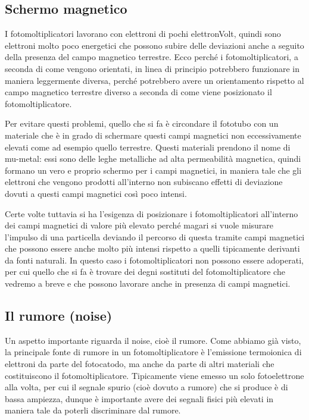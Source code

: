 \subsection{Schermo magnetico}

I fotomoltiplicatori lavorano con elettroni di pochi elettronVolt, quindi sono elettroni molto poco energetici che possono subire delle deviazioni anche a seguito della presenza del campo magnetico terrestre. Ecco perché i fotomoltiplicatori, a seconda di come vengono orientati, in linea di principio potrebbero funzionare in maniera leggermente diversa, perché potrebbero avere un orientamento rispetto al campo magnetico terrestre diverso a seconda di come viene posizionato il fotomoltiplicatore.

Per evitare questi problemi, quello che si fa è circondare il fototubo con un materiale che è in grado di schermare questi campi magnetici non eccessivamente elevati come ad esempio quello terrestre. Questi materiali prendono il nome di mu-metal: essi sono delle leghe metalliche ad alta permeabilità magnetica, quindi formano un vero e proprio schermo per i campi magnetici, in maniera tale che gli elettroni che vengono prodotti all'interno non subiscano effetti di deviazione dovuti a questi campi magnetici così poco intensi.

Certe volte tuttavia si ha l'esigenza di posizionare i fotomoltiplicatori all'interno dei campi magnetici di valore più elevato perché magari si vuole misurare l'impulso di una particella deviando il percorso di questa tramite campi magnetici che possono essere anche molto più intensi rispetto a quelli tipicamente derivanti da fonti naturali. In questo caso i fotomoltiplicatori non possono essere adoperati, per cui quello che si fa è trovare dei degni sostituti del fotomoltiplicatore che vedremo a breve e che possono lavorare anche in presenza di campi magnetici.

\subsection{Il rumore (noise)}
Un aspetto importante riguarda il noise, cioè il rumore. Come abbiamo già visto, la principale fonte di rumore in un fotomoltiplicatore è l'emissione termoionica di elettroni da parte del fotocatodo, ma anche da parte di altri materiali che costituiscono il fotomoltiplicatore. Tipicamente viene emesso un solo fotoelettrone alla volta, per cui il segnale spurio (cioè dovuto a rumore) che si produce è di bassa ampiezza, dunque è importante avere dei segnali fisici più elevati in maniera tale da poterli discriminare dal rumore.

